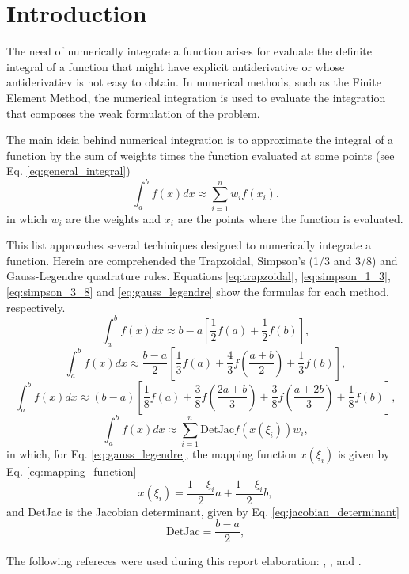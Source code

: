\section{Introduction} \label{sec:introduction}
The need of numerically integrate a function arises for evaluate the definite integral of a function that might have explicit antiderivative or whose antiderivatiev is not easy to obtain. In numerical methods, such as the Finite Element Method, the numerical integration is used to evaluate the integration that composes the weak formulation of the problem. 
 
The main ideia behind numerical integration is to approximate the integral of a function by the sum of weights times the function evaluated at some points (see Eq. \eqref{eq:general_integral})
\begin{equation}
    \int_{a}^{b} f(x) dx \approx \sum_{i=1}^{n} w_i f(x_i).
    \label{eq:general_integral}
\end{equation}
in which $w_i$ are the weights and $x_i$ are the points where the function is evaluated.

This list approaches several techiniques designed to numerically integrate a function. Herein are comprehended the Trapzoidal, Simpson's (1/3 and 3/8) and Gauss-Legendre quadrature rules. Equations \eqref{eq:trapzoidal}, \eqref{eq:simpson_1_3}, \eqref{eq:simpson_3_8} and \eqref{eq:gauss_legendre} show the formulas for each method, respectively.
\begin{equation}
    \int_{a}^{b} f(x) dx \approx b-a \left[ \frac{1}{2}f(a) + \frac{1}{2}f(b) \right],
    \label{eq:trapzoidal}
\end{equation}
\begin{equation}
    \int_{a}^{b} f(x) dx \approx \frac{b-a}{2} \left[ \frac{1}{3}f(a) + \frac{4}{3}f\left(\frac{a+b}{2}\right) + \frac{1}{3}f(b) \right],
    \label{eq:simpson_1_3}
\end{equation}
\begin{equation}
    \int_{a}^{b} f(x) dx\approx (b-a) \left[ \frac{1}{8}f(a) + \frac{3}{8}f\left(\frac{2a+b}{3}\right) + \frac{3}{8}f\left(\frac{a+2b}{3}\right) + \frac{1}{8}f(b) \right],
    \label{eq:simpson_3_8}
\end{equation}
\begin{equation}
    \int_{a}^{b} f(x) dx \approx \sum_{i=1}^{n} \text{DetJac} f\left(x(\xi_i)\right) w_i,
    \label{eq:gauss_legendre}
\end{equation}
in which, for Eq. \eqref{eq:gauss_legendre}, the mapping function $x(\xi_i)$ is given by Eq. \eqref{eq:mapping_function}
\begin{equation}
    x(\xi_i) = \frac{1 - \xi_i}{2} a + \frac{1 + \xi_i}{2} b,
    \label{eq:mapping_function}
\end{equation}
and DetJac is the Jacobian determinant, given by Eq. \eqref{eq:jacobian_determinant}
\begin{equation}
    \text{DetJac} = \frac{b-a}{2},
    \label{eq:jacobian_determinant}
\end{equation}

The following refereces were used during this report elaboration: \cite{becker1981finite}, \cite{burden2005student}, and \cite{cunhametodos}.